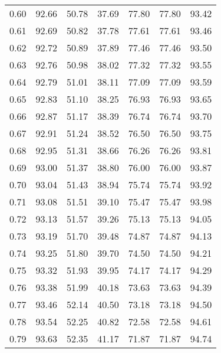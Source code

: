 \begin{tabular}{|c|c|c|c|c|c|c|}
      0.60 &     92.66 &     50.78 &      37.69 &   77.80 &      77.80 &         93.42 \\
      0.61 &     92.69 &     50.82 &      37.78 &   77.61 &      77.61 &         93.46 \\
      0.62 &     92.72 &     50.89 &      37.89 &   77.46 &      77.46 &         93.50 \\
      0.63 &     92.76 &     50.98 &      38.02 &   77.32 &      77.32 &         93.55 \\
      0.64 &     92.79 &     51.01 &      38.11 &   77.09 &      77.09 &         93.59 \\
      0.65 &     92.83 &     51.10 &      38.25 &   76.93 &      76.93 &         93.65 \\
      0.66 &     92.87 &     51.17 &      38.39 &   76.74 &      76.74 &         93.70 \\
      0.67 &     92.91 &     51.24 &      38.52 &   76.50 &      76.50 &         93.75 \\
      0.68 &     92.95 &     51.31 &      38.66 &   76.26 &      76.26 &         93.81 \\
      0.69 &     93.00 &     51.37 &      38.80 &   76.00 &      76.00 &         93.87 \\
      0.70 &     93.04 &     51.43 &      38.94 &   75.74 &      75.74 &         93.92 \\
      0.71 &     93.08 &     51.51 &      39.10 &   75.47 &      75.47 &         93.98 \\
      0.72 &     93.13 &     51.57 &      39.26 &   75.13 &      75.13 &         94.05 \\
      0.73 &     93.19 &     51.70 &      39.48 &   74.87 &      74.87 &         94.13 \\
      0.74 &     93.25 &     51.80 &      39.70 &   74.50 &      74.50 &         94.21 \\
      0.75 &     93.32 &     51.93 &      39.95 &   74.17 &      74.17 &         94.29 \\
      0.76 &     93.38 &     51.99 &      40.18 &   73.63 &      73.63 &         94.39 \\
      0.77 &     93.46 &     52.14 &      40.50 &   73.18 &      73.18 &         94.50 \\
      0.78 &     93.54 &     52.25 &      40.82 &   72.58 &      72.58 &         94.61 \\
      0.79 &     93.63 &     52.35 &      41.17 &   71.87 &      71.87 &         94.74 \\

\end{tabular}
